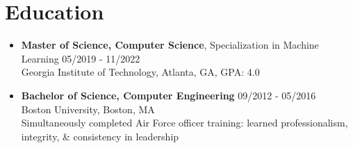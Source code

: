\documentclass{article}
\begin{document}

\section{Education} \begin{itemize}
    \itemsep0.2em
    \item \textbf{Master of Science, Computer Science}, Specialization in Machine Learning \hfill 05/2019 - 11/2022\\Georgia Institute of Technology, Atlanta, GA, GPA: 4.0
    \item \textbf{Bachelor of Science, Computer Engineering} \hfill 09/2012 - 05/2016\\Boston University, Boston, MA\\Simultaneously completed Air Force officer training: learned professionalism, integrity, \& consistency in leadership  \end{itemize} 

\end{document}
